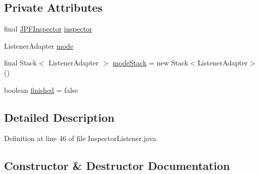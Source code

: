 \subsection*{Private Attributes}
\begin{DoxyCompactItemize}
\item 
final \hyperlink{classgov_1_1nasa_1_1jpf_1_1inspector_1_1server_1_1jpf_1_1_j_p_f_inspector}{J\+P\+F\+Inspector} \hyperlink{classgov_1_1nasa_1_1jpf_1_1inspector_1_1server_1_1jpf_1_1_inspector_listener_aa9eefde45ad4c9704c87520e1dc2c29b}{inspector}
\item 
Listener\+Adapter \hyperlink{classgov_1_1nasa_1_1jpf_1_1inspector_1_1server_1_1jpf_1_1_inspector_listener_a666ea4f9fb4e868903700b0a0523a992}{mode}
\item 
final Stack$<$ Listener\+Adapter $>$ \hyperlink{classgov_1_1nasa_1_1jpf_1_1inspector_1_1server_1_1jpf_1_1_inspector_listener_a0b6bfce4730f04507fef5bd418a96a4c}{mode\+Stack} = new Stack$<$Listener\+Adapter$>$()
\item 
boolean \hyperlink{classgov_1_1nasa_1_1jpf_1_1inspector_1_1server_1_1jpf_1_1_inspector_listener_acfc69bebb12dc44e0227f0eda89e9be2}{finished} = false
\end{DoxyCompactItemize}


\subsection{Detailed Description}


Definition at line 46 of file Inspector\+Listener.\+java.



\subsection{Constructor \& Destructor Documentation}
